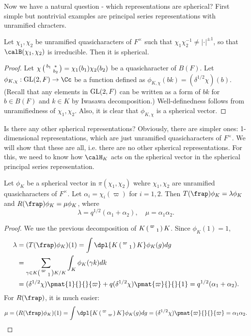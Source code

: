 Now we have a natural question - which representations are spherical? 
First simple but nontrivial examples are principal series representations with unramified chracters. 
\begin{proposition}
Let $\chi_1, \chi_2$ be unramified quasicharacters of $F^{\times}$ such that $\chi_{1}\chi_{2}^{-1}\neq |\cdot|^{\pm 1}$, so that $\calB(\chi_1, \chi_2)$ is irreducible. 
Then it is spherical. 
\end{proposition}
\begin{proof}
Let $\chi\left(\begin{smallmatrix} b_{1} & * \\  & b_{2} \end{smallmatrix}\right) = \chi_{1}(b_{1})\chi_{2}(b_{2})$ be a quasicharacter of $B(F)$. 
Let $\phi_{K, \chi}:\GL(2, F)\to \Cc$ be a function defined as $\phi_{K, \chi}(bk) = (\delta^{1/2}\chi)(b)$. (Recall that any elements in $\mathrm{GL}(2, F)$ can be written as a form of $bk$ for $b\in B(F)$ and $k\in K$ by Iwasawa decomposition.)
Well-definedness follows from unramifiedness of $\chi_1, \chi_2$. 
Also, it is clear that $\phi_{K, \chi}$ is a spherical vector. 
\end{proof}
Is there any other spherical representations? Obviously, there are simpler ones: 1-dimensional representations, which are just unramified quasicharacters of $F^{\times}$. 
We will show that these are all, i.e. there are no other spherical representations. 
For this, we need to know how $\calH_K$ acts on the spherical vector in the spherical principal series representation. 
\begin{proposition}
Let $\phi_K$ be a spherical vector in $\pi(\chi_1, \chi_2)$ wehre $\chi_1, \chi_2$ are unramified quasicharacters of $F^{\times}$. 
Let $\alpha_i = \chi_i(\varpi)$ for $i = 1, 2$. 
Then $T(\frap)\phi_K = \lambda \phi_K$ and $R(\frap)\phi_K = \mu \phi_K$, where
$$
\lambda = q^{1/2}(\alpha_1 + \alpha_2), \quad \mu = \alpha_1 \alpha_2.
$$
\end{proposition}
\begin{proof}
We use the previous decomposition of $K\left(\begin{smallmatrix} \varpi &  \\  & 1 \end{smallmatrix}\right)K$. Since $\phi_K(1) = 1$, 
\begin{align*}
\lambda &= (T(\frap)\phi_K)(1) = \int\dpl{K\smat{\varpi}{}{}{1}K} \phi_{K}(g)dg \\
&= \sum_{\gamma\in K\smat{\varpi}{}{}{1}K/K} \int_K \phi_K(\gamma k)dk \\
&= (\delta^{1/2}\chi)\pmat{1}{}{}{\varpi} + q(\delta^{1/2}\chi)\pmat{\varpi}{}{}{1} = q^{1/2}(\alpha_1 + \alpha_2). 
\end{align*}
For $R(\frap)$, it is much easier:
$$
\mu = (R(\frap)\phi_K)(1) = \int\dpl{K\smat{\varpi}{}{}{\varpi}K} \phi_K(g)dg = (\delta^{1/2}\chi)\pmat{\varpi}{}{}{\varpi} = \alpha_1 \alpha_2. 
$$
\end{proof}
